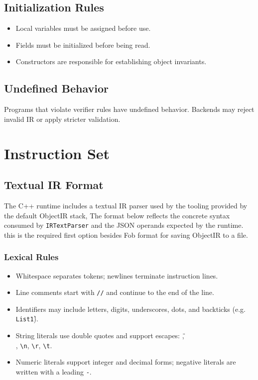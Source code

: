 \documentclass[11pt,a4paper]{article}
\begin{document}
	\subsection{Initialization Rules}
	\begin{itemize}
		\item Local variables must be assigned before use.
		\item Fields must be initialized before being read.
		\item Constructors are responsible for establishing object invariants.
	\end{itemize}
	
	\subsection{Undefined Behavior}
	Programs that violate verifier rules have undefined behavior. Backends may reject invalid IR or apply stricter validation.
	
	\section{Instruction Set}
	
	\subsection{Textual IR Format}
	The C++ runtime includes a textual IR parser used by the tooling provided by the default ObjectIR stack, The format below reflects the concrete syntax consumed by \texttt{IRTextParser} and the JSON operands expected by the runtime.
	this is the required first option besides Fob format for saving ObjectIR to a file.
	
	\subsubsection{Lexical Rules}
	\begin{itemize}
		\item Whitespace separates tokens; newlines terminate instruction lines.
		\item Line comments start with \texttt{//} and continue to the end of the line.
		\item Identifiers may include letters, digits, underscores, dots, and backticks (e.g. \texttt{List\`1}).
		\item String literals use double quotes and support escapes: \texttt{\"}, \texttt{\\}, \texttt{\textbackslash n}, \texttt{\textbackslash r}, \texttt{\textbackslash t}.
		\item Numeric literals support integer and decimal forms; negative literals are written with a leading \texttt{-}.
	\end{itemize}
	
\end{document}
